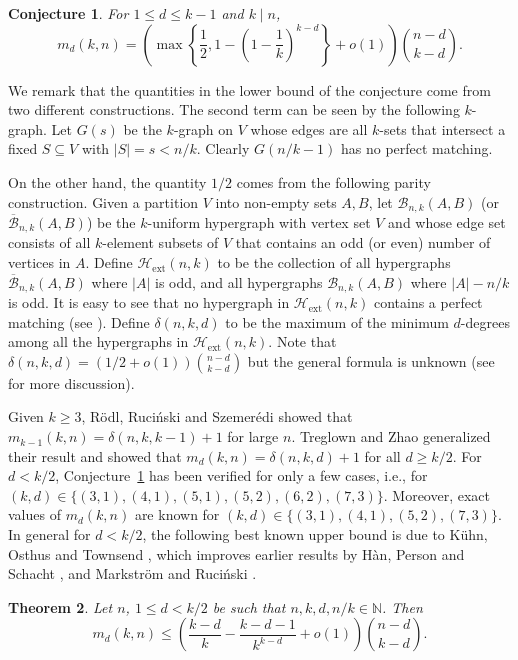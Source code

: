 \documentclass{amsart}
\newtheorem{theorem}{Theorem}
\theoremstyle{plain}
\newtheorem{conjecture}[theorem]{Conjecture}
\numberwithin{equation}{section}
\numberwithin{theorem}{section}
\numberwithin{case}{section}
\numberwithin{subcase}{case}
\begin{document}
\begin{conjecture}\label{conj:mat}
For $1\le d\le k-1$ and $k \mid n$,
\[
m_d(k,n) = \left(\max \left\{ \frac12, 1- \left(1- \frac{1}{k} \right)^{k-d}  \right\} +o(1)\right)\binom{n-d}{k-d}.
\]
\end{conjecture}

We remark that the quantities in the lower bound of the conjecture come from two different constructions. 
The second term can be seen by the following $k$-graph.
Let $G(s)$ be the $k$-graph on $V$ whose edges are all $k$-sets that intersect a fixed $S\subseteq V$ with $|S|=s < n/k$. Clearly $G(n/k-1)$ has no perfect matching.

On the other hand, the quantity $1/2$ comes from the following parity construction.
Given a partition $V$ into non-empty sets $A, B$, let ${\mathcal{B}}_{n,k}(A,B)$ (or $\overline{\mathcal{B}}_{n,k}(A,B)$) be the $k$-uniform hypergraph with vertex set $V$ and whose edge set consists of all $k$-element subsets of $V$ that contains an odd (or even) number of vertices in $A$.
Define ${\mathcal{H}}_{\text{ext}}(n,k)$ to be the collection of all hypergraphs $\overline{\mathcal{B}}_{n,k}(A,B)$ where $|A|$ is odd, and all hypergraphs ${\mathcal{B}}_{n,k}(A,B)$ where $|A|-n/k$ is odd.
It is easy to see that no hypergraph in ${\mathcal{H}}_{\text{ext}}(n,k)$ contains a perfect matching (see \cite{TrZh12}).
Define $\delta(n,k,d)$ to be the maximum of the minimum $d$-degrees among all the hypergraphs in ${\mathcal{H}}_{\text{ext}}(n,k)$.
Note that $\delta(n,k,d)= (1/2+o(1)) \binom{n-d}{k-d}$ but the general formula is unknown (see \cite{TrZh12} for more discussion).

Given $k\ge 3$, R\"odl, Ruci\'nski and Szemer\'edi \cite{RRS09} showed that $m_{k-1}(k,n)=\delta(n,k,k-1)+1$ for large $n$.
Treglown and Zhao \cite{TrZh12, TrZh13} generalized their result and showed that $m_d(k,n)=\delta(n,k,d)+1$ for all $d\ge k/2$.
For $d<k/2$, Conjecture~\ref{conj:mat} has been verified \cite{AFHRRS, HPS, Khan1, Khan2, KOT, TrZh15} for only a few cases, i.e., for $(k,d)\in \{(3,1), (4,1),(5,1),(5,2), (6,2), (7,3)\}$.
Moreover, exact values of $m_d(k,n)$ are known for $(k,d)\in \{(3,1), (4,1),(5,2), (7,3)\}$.
In general for $d<k/2$, the following best known upper bound is due to K\"uhn, Osthus and Townsend \cite[Theorem 1.2]{KOTo}, which improves earlier results by H\`an, Person and Schacht \cite{HPS}, and Markstr\"om and Ruci\'nski \cite{MaRu}.

\begin{theorem}\cite{KOTo}\label{thm:KOTo}
Let $n$, $1\le d<k/2$ be such that $n, k, d, n/k\in \mathbb{N}$. Then
\[
m_d(k,n) \le \left( \frac{k-d}k - \frac{k-d-1}{k^{k-d}} + o(1) \right) \binom{n-d}{k-d}.
\]
\end{theorem}
\end{document}
